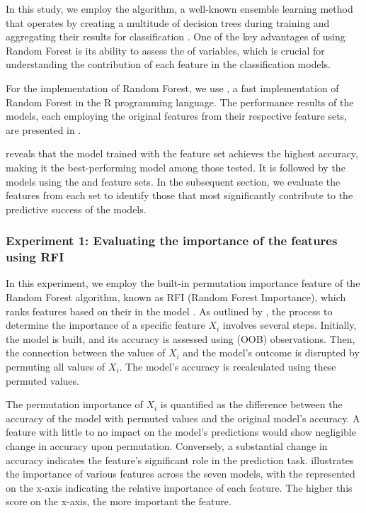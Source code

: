 In this study, we employ the  algorithm, a well-known ensemble learning method that operates by creating a multitude of decision trees during training and aggregating their results for classification \citep{nayak2016comparative,biau2012analysis}. One of the key advantages of using Random Forest is its ability to assess the  of variables, which is crucial for understanding the contribution of each feature in the classification models.

For the implementation of Random Forest, we use  \citep{wright2015ranger}, a fast implementation of Random Forest in the R programming language. The performance results of the models, each employing the original features from their respective feature sets, are presented in .



 reveals that the model trained with the  feature set achieves the highest accuracy, making it the best-performing model among those tested. It is followed by the models using the  and  feature sets. In the subsequent section, we evaluate the features from each set to identify those that most significantly contribute to the predictive success of the models.

\subsubsection{Experiment 1: Evaluating the importance of the features using RFI} \label{subsec:rfi}

In this experiment, we employ the built-in permutation importance feature of the Random Forest algorithm, known as RFI (Random Forest Importance), which ranks features based on their  in the model \citep{breiman2001random}. As outlined by \citet{strobl2008conditional}, the process to determine the importance of a specific feature \texttt{$X_{i}$} involves several steps. Initially, the model is built, and its accuracy is assessed using  (OOB) observations. Then, the connection between the values of \texttt{$X_{i}$} and the model's outcome is disrupted by permuting all values of \texttt{$X_{i}$}. The model's accuracy is recalculated using these permuted values.

The permutation importance of \texttt{$X_{i}$} is quantified as the difference between the accuracy of the model with permuted values and the original model's accuracy. A feature with little to no impact on the model's predictions would show negligible change in accuracy upon permutation. Conversely, a substantial change in accuracy indicates the feature's significant role in the prediction task.  illustrates the importance of various features across the seven models, with the  represented on the x-axis indicating the relative importance of each feature. The higher this score on the x-axis, the more important the feature.

